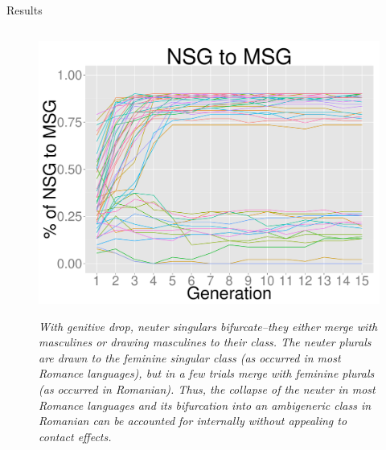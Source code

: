 \documentclass[final]{beamer}
\newlength{\twocolwid}
\begin{document}
\begin{frame}[t]
\begin{columns}[t]
\begin{column}{\twocolwid}
\begin{block}{Results}
\begin{columns}[t]
\begin{column}{.33\linewidth}
\begin{figure}
\begin{center} 
\vspace{2cm}
{\centering \includegraphics[width=1\textwidth]{nsgtomsg.pdf}}
\end{center}
\footnotesize
\caption{\textit{With genitive drop, neuter singulars bifurcate--they either merge with masculines or drawing masculines to their class. The neuter plurals are drawn to the feminine singular class (as occurred in most Romance languages), but in a few trials merge with feminine plurals (as occurred in Romanian). Thus, the collapse of the neuter in most Romance languages and its bifurcation into an ambigeneric class in Romanian can be accounted for internally without appealing to contact effects.}}

\end{figure}     
            
      \end{column}      
       

\end{columns}
\end{block}
\end{column}
\end{columns}
\end{frame}
\end{document}
